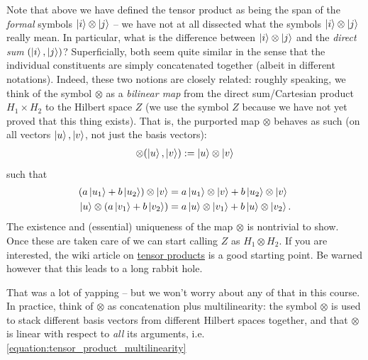\begin{remark}
    Note that above we have defined the tensor product as being the span of the \textit{formal} symbols $\ket{i} \otimes \ket{j}$ -- we have not at all dissected what the symbols $\ket{i} \otimes \ket{j}$ really mean. In particular, what is the difference between $\ket{i} \otimes \ket{j}$ and the \textit{direct sum} $(\ket{i}, \ket{j})$? Superficially, both seem quite similar in the sense that the individual constituents are simply concatenated together (albeit in different notations). Indeed, these two notions are closely related: roughly speaking, we think of the symbol $\otimes$ as a \textit{bilinear map} from the direct sum/Cartesian product $H_1 \times H_2$ to the Hilbert space $Z$ (we use the symbol $Z$ because we have not yet proved that this thing exists). That is, the purported map $\otimes$ behaves as such (on all vectors $\ket{u}, \ket{v}$, not just the basis vectors):
    \begin{align*}
        \otimes(\ket{u},\ket{v}) := \ket{u} \otimes \ket{v}
    \end{align*}
    such that
    \begin{align}\label{equation:tensor_product_multilinearity}
        (a\ket{u_1}+b\ket{u_2}) \otimes \ket{v} &= a\ket{u_1} \otimes \ket{v} + b\ket{u_2} \otimes \ket{v}\\
        \ket{u} \otimes(a\ket{v_1}+b\ket{v_2}) &= a\ket{u} \otimes \ket{v_1} + b\ket{u} \otimes \ket{v_2}.
    \end{align}
    The existence and (essential) uniqueness of the map $\otimes$ is nontrivial to show. Once these are taken care of we can start calling $Z$ as $H_1 \otimes H_2$. If you are interested, the wiki article on \href{https://en.wikipedia.org/wiki/Tensor_product}{tensor products} is a good starting point. Be warned however that this leads to a long rabbit hole.

    That was a lot of yapping -- but we won't worry about any of that in this course. In practice, think of $\otimes$ as concatenation plus multilinearity: the symbol $\otimes$ is used to stack different basis vectors from different Hilbert spaces together, and that $\otimes$ is linear with respect to \textit{all} its arguments, i.e. \cref{equation:tensor_product_multilinearity}
\end{remark}

